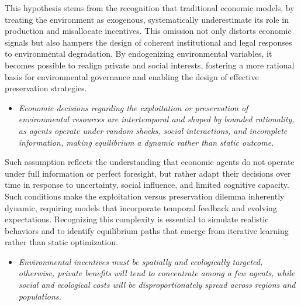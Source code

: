 This hypothesis stems from the recognition that traditional economic models, by treating the environment as exogenous, systematically underestimate its role in production and misallocate incentives. This omission not only distorts economic signals but also hampers the design of coherent institutional and legal responses to environmental degradation. By endogenizing environmental variables, it becomes possible to realign private and social interests, fostering a more rational basis for environmental governance and enabling the design of effective preservation strategies.

\begin{itemize}

    \item[\textbf{H2.}] 
    
    \textit{Economic decisions regarding the exploitation or preservation of environmental resources are intertemporal and shaped by bounded rationality, as agents operate under random shocks, social interactions, and incomplete information, making equilibrium a dynamic rather than static outcome.}
    
\end{itemize}

Such assumption reflects the understanding that economic agents do not operate under full information or perfect foresight, but rather adapt their decisions over time in response to uncertainty, social influence, and limited cognitive capacity. Such conditions make the exploitation versus preservation dilemma inherently dynamic, requiring models that incorporate temporal feedback and evolving expectations. Recognizing this complexity is essential to simulate realistic behaviors and to identify equilibrium paths that emerge from iterative learning rather than static optimization. 

\begin{itemize}  

    \item[\textbf{H3.}] 
    
    \textit{Environmental incentives must be spatially and ecologically targeted, otherwise, private benefits will tend to concentrate among a few agents, while social and ecological costs will be disproportionately spread across regions and populations.}
\end{itemize}

